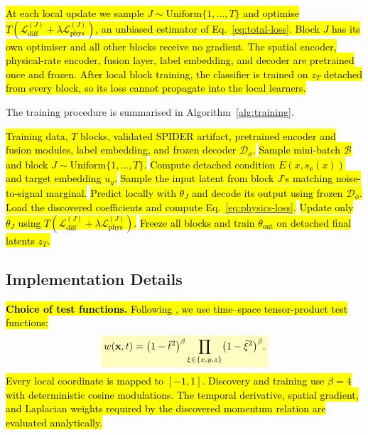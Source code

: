 \documentclass[preprint,12pt]{elsarticle}
\newcommand{\rev}[1]{\hl{#1}}
\newcommand{\revmath}[1]{\colorbox{yellow!25}{$#1$}}
\begin{document}
\rev{At each local update we sample $J\sim\mathrm{Uniform}\{1,\ldots,T\}$ and optimise $T(\mathcal{L}_{\mathrm{diff}}^{(J)}+\lambda\mathcal{L}_{\mathrm{phys}}^{(J)})$, an unbiased estimator of Eq.~\eqref{eq:total-loss}. Block $J$ has its own optimiser and all other blocks receive no gradient. The spatial encoder, physical-rate encoder, fusion layer, label embedding, and decoder are pretrained once and frozen. After local block training, the classifier is trained on $z_T$ detached from every block, so its loss cannot propagate into the local learners.}

The training procedure is summarised in Algorithm~\ref{alg:training}.

\begin{algorithm}[htbp]
\color{black}
\caption{Training of Physics-Informed NoProp}
\label{alg:training}
\begin{algorithmic}[1]
\REQUIRE \rev{Training data, $T$ blocks, validated SPIDER artifact, pretrained encoder and fusion modules, label embedding, and frozen decoder $\mathcal D_\phi$.}
\FOR{\rev{each local update}}
    \STATE \rev{Sample mini-batch $\mathcal B$ and block $J\sim\mathrm{Uniform}\{1,\ldots,T\}$.}
    \STATE \rev{Compute detached condition $E(x,s_{\mathbf c}(x))$ and target embedding $u_y$.}
    \STATE \rev{Sample the input latent from block $J$'s matching noise-to-signal marginal.}
    \STATE \rev{Predict locally with $\theta_J$ and decode its output using frozen $\mathcal D_\phi$.}
    \STATE \rev{Load the discovered coefficients and compute Eq.~\eqref{eq:physics-loss}.}
    \STATE \rev{Update only $\theta_J$ using $T(\mathcal L_{\mathrm{diff}}^{(J)}+\lambda\mathcal L_{\mathrm{phys}}^{(J)})$.}
\ENDFOR
\STATE \rev{Freeze all blocks and train $\theta_{\mathrm{out}}$ on detached final latents $z_T$.}
\end{algorithmic}
\end{algorithm}

\subsection{Implementation Details}
\label{sec:implementation}

\rev{\textbf{Choice of test functions.} Following \cite{gurevich2019robust,gurevich2024learning}, we use time--space tensor-product test functions:}
\begin{equation}
\label{eq:test-function}
\revmath{\displaystyle
w(\mathbf{x},t)=\bigl(1-\tilde t^2\bigr)^\beta
\prod_{\xi\in\{x,y,z\}}\bigl(1-\tilde\xi^2\bigr)^\beta.}
\end{equation}
\rev{Every local coordinate is mapped to $[-1,1]$. Discovery and training use $\beta=4$ with deterministic cosine modulations. The temporal derivative, spatial gradient, and Laplacian weights required by the discovered momentum relation are evaluated analytically.}
\end{document}

